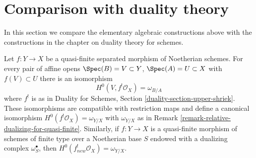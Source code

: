 \section{Comparison with duality theory}
\label{section-comparison}

\noindent
In this section we compare the elementary algebraic constructions
above with the constructions in the chapter on duality theory
for schemes.

\begin{lemma}
\label{lemma-compare-dualizing}
Let $f : Y \to X$ be a quasi-finite separated morphism of Noetherian schemes.
For every pair of affine opens $\Spec(B) = V \subset Y$,
$\Spec(A) = U \subset X$ with $f(V) \subset U$ there is an isomorphism
$$
H^0(V, f^!\mathcal{O}_X) = \omega_{B/A}
$$
where $f^!$ is as in
Duality for Schemes, Section \ref{duality-section-upper-shriek}.
These isomorphisms are compatible with restriction maps and define a canonical
isomorphism $H^0(f^!\mathcal{O}_X) = \omega_{Y/X}$ with
$\omega_{Y/X}$ as in Remark \ref{remark-relative-dualizing-for-quasi-finite}.
Similarly, if $f : Y \to X$ is a quasi-finite morphism of schemes of
finite type over a Noetherian base $S$ endowed with a dualizing complex
$\omega_S^\bullet$, then $H^0(f_{new}^!\mathcal{O}_X) = \omega_{Y/X}$.
\end{lemma}

